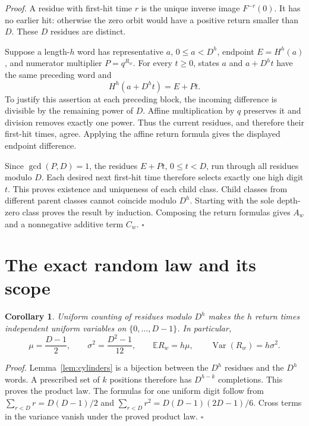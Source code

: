 \documentclass[11pt,letterpaper]{article}
\newtheorem{corollary}[theorem]{Corollary}
\newenvironment{proof}{\noindent\textit{Proof.}}{\hfill\(\square\)}
\begin{document}
\begin{proof}
A residue with first-hit time \(r\) is the unique inverse image \(F^{-r}(0)\).
It has no earlier hit: otherwise the zero orbit would have a positive
return smaller than \(D\). These \(D\) residues are distinct.

Suppose a length-\(h\) word has representative \(a\), \(0\le a<D^h\),
endpoint \(E=H^h(a)\), and numerator multiplier \(P=q^{R_w}\).
For every \(t\ge0\), states \(a\) and \(a+D^h t\) have the same preceding
word and
\[
H^h(a+D^h t)=E+Pt.
\]
To justify this assertion at each preceding block, the incoming difference
is divisible by the remaining power of \(D\). Affine multiplication by \(q\)
preserves it and division removes exactly one power. Thus the current
residues, and therefore their first-hit times, agree. Applying the affine
return formula gives the displayed endpoint difference.

Since \(\gcd(P,D)=1\), the residues \(E+Pt\), \(0\le t<D\), run through all
residues modulo \(D\). Each desired next first-hit time therefore selects
exactly one high digit \(t\). This proves existence and uniqueness of
each child class. Child classes from different parent classes cannot
coincide modulo \(D^h\). Starting with the sole depth-zero class proves
the result by induction. Composing the return formulas gives \(A_w\)
and a nonnegative additive term \(C_w\).
\end{proof}

\section{The exact random law and its scope}

\begin{corollary}
\label{cor:moments}
Uniform counting of residues modulo \(D^h\) makes the \(h\) return times
independent uniform variables on \(\{0,\ldots,D-1\}\). In particular,
\[
\mu=\frac{D-1}{2},\qquad
\sigma^2=\frac{D^2-1}{12},\qquad
\mathbb E R_w=h\mu,\qquad
\operatorname{Var}(R_w)=h\sigma^2.
\]
\end{corollary}

\begin{proof}
Lemma~\ref{lem:cylinders} is a bijection between the \(D^h\) residues and
the \(D^h\) words. A prescribed set of \(k\) positions therefore has
\(D^{h-k}\) completions. This proves the product law. The formulas for
one uniform digit follow from
\(\sum_{r<D}r=D(D-1)/2\) and
\(\sum_{r<D}r^2=D(D-1)(2D-1)/6\).
Cross terms in the variance vanish under the proved product law.
\end{proof}
\end{document}
